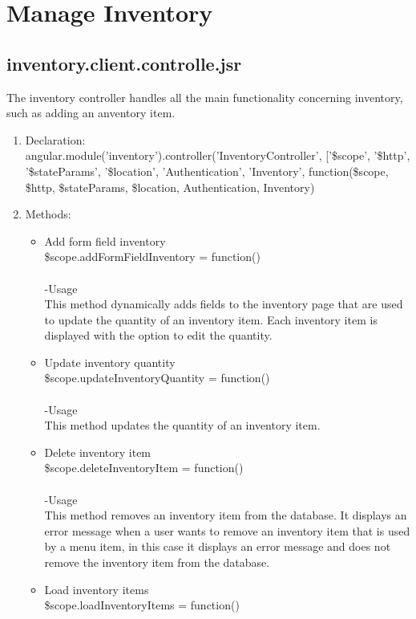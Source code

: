 \documentclass[a4paper,12pt]{article}
\begin{document}
\section{Manage Inventory}
\subsection{inventory.client.controlle.jsr}
 The inventory controller handles all the main functionality concerning inventory, such as adding an anventory item.
\begin{enumerate}
\item Declaration:\\angular.module('inventory').controller('InventoryController', ['\$scope', '\$http', '\$stateParams', '\$location', 'Authentication', 'Inventory',
	function(\$scope, \$http, \$stateParams, \$location, Authentication, Inventory)
\item Methods:
	\begin{itemize}
	\item Add form field inventory\\
  \$scope.addFormFieldInventory = function()\\ \\
  -Usage\\ 
  This method dynamically adds fields to the inventory page that are used to update the quantity of an inventory item. Each inventory item is displayed with the option to edit the quantity.
\item  Update inventory quantity\\
 \$scope.updateInventoryQuantity = function()\\ \\
 -Usage\\
 This method updates the quantity of an inventory item.
 \item Delete inventory item\\
  \$scope.deleteInventoryItem = function()\\ \\
  -Usage\\ 
  This method removes an inventory item from the database. It displays an error message when a user wants to remove an inventory item that is used by a menu item, in this case it displays an error message and does not remove the inventory item from the database.
  \item Load inventory items\\
   \$scope.loadInventoryItems = function()\\ \\

\end{itemize}
\end{enumerate}
\end{document}
